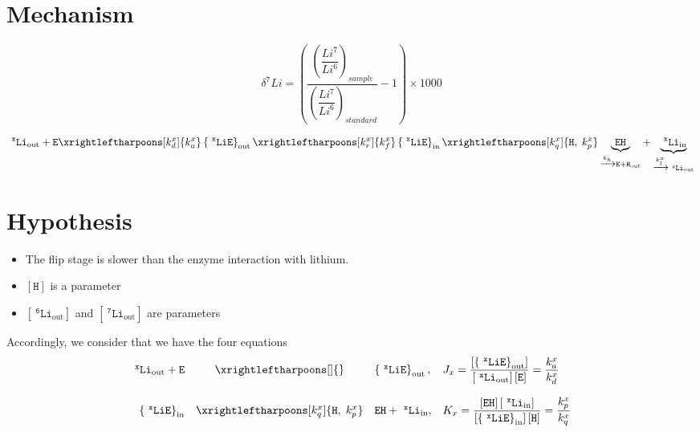 \documentclass[aps,onecolumn,11pt]{revtex4}
\newcommand{\mychem}[1]{\mathtt{#1}}
\newcommand{\myconc}[1]{\left\lbrack{#1}\right\rbrack}
\newcommand{\spLi}[1]{{~^{\mychem{#1}}\mychem{Li}}}
\newcommand{\spEout}{\mychem{E}}
\newcommand{\Eout}{\myconc{\spEout}}
\newcommand{\spLiEin}[1]{\left\lbrace\spLi{#1}\spEout\right\rbrace_{\mathrm{in}}}
\newcommand{\LiEin}[1]{\myconc{\spLiEin{#1}}}
\newcommand{\spLiEout}[1]{\left\lbrace\spLi{#1}\spEout\right\rbrace_{\mathrm{out}}}
\newcommand{\LiEout}[1]{\myconc{\spLiEout{#1}}}
\newcommand{\spLiIn}[1]{{\spLi{#1}}_{\mathrm{in}}}
\newcommand{\LiIn}[1]{\myconc{\spLiIn{#1}}}
\newcommand{\spLiOut}[1]{{\spLi{#1}}_{\mathrm{out}}}
\newcommand{\LiOut}[1]{\myconc{\spLiOut{#1}}}
\newcommand{\spEHin}{\mychem{EH}}
\newcommand{\EHin}{\myconc{\spEHin}}
\newcommand{\spproton}{\mychem{H}}
\newcommand{\proton}{\myconc{\spproton}}
\begin{document}
\section{Mechanism}
$$
	\delta^7Li = \left(
		\dfrac{\left(\dfrac{Li^7}{Li^6}\right)_{sample}}
		{\left(\dfrac{Li^7}{Li^6}\right)_{standard}}
		 -1 
	\right) \times 1000
$$


\begin{equation}
	 \spLiOut{x} +  \spEout  
	 \xrightleftharpoons[k_d^x]{k_a^x} 
	 \spLiEout{x}
	  \xrightleftharpoons[k_r^x]{k_f^x} 
	  \spLiEin{x} 
	  \xrightleftharpoons[k_q^x]{\mychem{H},\;k_p^x} \underbrace{\spEHin}_{\xrightarrow[]{k_h} \mychem{E} + \mychem{H}_{\mathrm{out}}} + \underbrace{\spLiIn{x}}_{\xrightarrow[]{k_l^x} \spLiOut{x}}
\end{equation}

\section{Hypothesis}
\begin{itemize}
\item The flip stage is slower than the enzyme interaction with lithium.
\item $\proton$ is a parameter
\item $\LiOut{6}$ and  $\LiOut{7}$ are parameters
\end{itemize}

Accordingly, we consider that we have the four equations
\begin{equation}
	\begin{array}{rcll}
	 \spLiOut{x} +  \spEout &  \xrightleftharpoons[]{} & \spLiEout{x}, & J_x = \dfrac{\LiEout{x}}{\LiOut{x} \Eout} = \dfrac{k_a^x}{k_d^x}\\
	 \\
	 \spLiEin{x} & \xrightleftharpoons[k_q^x]{\mychem{H},\;k_p^x} & {\spEHin}+ \spLiIn{x}, &K_x = \dfrac{\EHin \LiIn{x}}{\LiEin{x}\proton} = \dfrac{k_p^x}{k_q^x} \\
	\end{array}
\end{equation}
\end{document}
